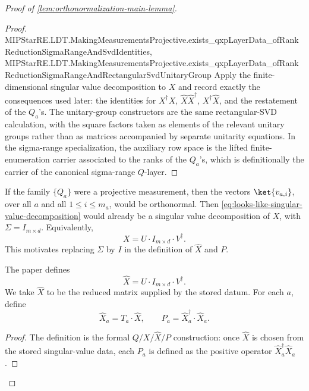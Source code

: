\begin{proof}[Proof of \ref{lem:orthonormalization-main-lemma}]
\begin{proof}
{			MIPStarRE.LDT.MakingMeasurementsProjective.exists_qxpLayerData_ofRankReductionSigmaRangeAndSvdIdentities,
			MIPStarRE.LDT.MakingMeasurementsProjective.exists_qxpLayerData_ofRankReductionSigmaRangeAndRectangularSvdUnitaryGroup}
		\leanok
		Apply the finite-dimensional singular value decomposition to \(X\) and
		record exactly the consequences used later: the identities for
		\(X^\dagger X\), \(\widehat X\widehat X^\dagger\),
		\(X^\dagger\widehat X\), and the restatement of the \(Q_a\)'s.  The
		unitary-group constructors are the same rectangular-SVD calculation, with
		the square factors taken as elements of the relevant unitary groups
		rather than as matrices accompanied by separate unitarity equations.  In
		the sigma-range specialization, the auxiliary row space is the lifted
		finite-enumeration carrier associated to the ranks of the \(Q_a\)'s, which
		is definitionally the carrier of the canonical sigma-range \(Q\)-layer.
	\end{proof}

	\begin{remark}\label{rem:motivation-for-P}
		If the family $\{Q_a\}$ were a projective measurement, then the vectors
		$\ket{v_{a,i}}$, over all $a$ and all $1 \leq i \leq m_a$, would be orthonormal.
		Then \eqref{eq:looks-like-singular-value-decomposition} would already be a singular value
		decomposition of $X$, with $\Sigma = I_{m \times d}$. Equivalently,
		\[
			X = U \cdot I_{m \times d} \cdot V^\dagger.
		\]
		This motivates replacing $\Sigma$ by $I$ in the definition of $\widehat X$ and $P$.
	\end{remark}

	\begin{definition}[Definition of~$P$]\label{def:projective-P}
		\leanok
		The paper defines
		\[
			\widehat{X} = U \cdot I_{m \times d} \cdot V^\dagger.
		\]
		We take $\widehat X$ to be the reduced matrix supplied by the stored datum.
		For each $a$, define
		\[
			\widehat{X}_a = T_a \cdot \widehat{X},
			\qquad
			P_a = \widehat{X}_a^\dagger \cdot \widehat{X}_a.
		\]
	\end{definition}
	\begin{proof}
		\leanok
		The definition is the formal \(Q/X/\widehat X/P\) construction: once
		\(\widehat X\) is chosen from the stored singular-value data, each
		\(P_a\) is defined as the positive operator
		\(\widehat X_a^\dagger\widehat X_a\).
	\end{proof}


\end{proof}
